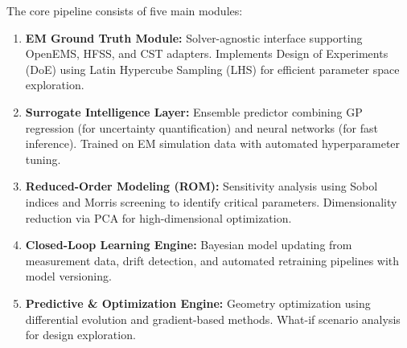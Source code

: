 \documentclass[conference]{IEEEtran}
\begin{document}
The core pipeline consists of five main modules:
\begin{enumerate}
    \item \textbf{EM Ground Truth Module:} Solver-agnostic interface supporting OpenEMS, HFSS, and CST adapters. Implements Design of Experiments (DoE) using Latin Hypercube Sampling (LHS) for efficient parameter space exploration.
    \item \textbf{Surrogate Intelligence Layer:} Ensemble predictor combining GP regression (for uncertainty quantification) and neural networks (for fast inference). Trained on EM simulation data with automated hyperparameter tuning.
    \item \textbf{Reduced-Order Modeling (ROM):} Sensitivity analysis using Sobol indices and Morris screening to identify critical parameters. Dimensionality reduction via PCA for high-dimensional optimization.
    \item \textbf{Closed-Loop Learning Engine:} Bayesian model updating from measurement data, drift detection, and automated retraining pipelines with model versioning.
    \item \textbf{Predictive \& Optimization Engine:} Geometry optimization using differential evolution and gradient-based methods. What-if scenario analysis for design exploration.
\end{enumerate}
\end{document}
